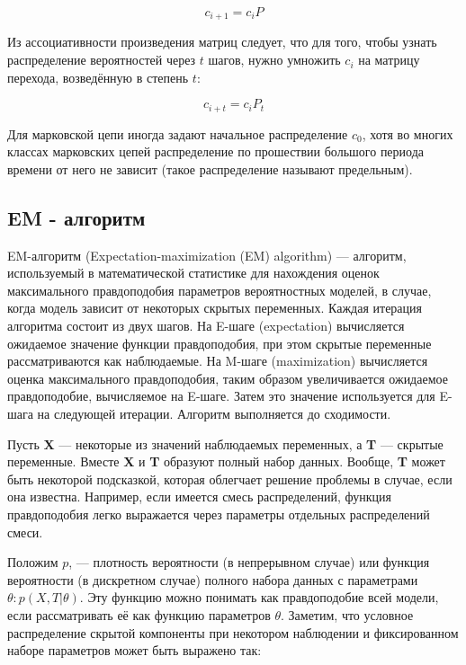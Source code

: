 \begin{equation}
  c_{i+1}=c_i P
\end{equation}

Из ассоциативности произведения матриц следует, что для того, чтобы узнать распределение вероятностей через $t$ шагов, нужно умножить $c_i$ на матрицу перехода, возведённую в степень $t$: 

\begin{equation}
  c_{i+t}=c_i P_t
\end{equation}

Для марковской цепи иногда задают начальное распределение $c_0$, хотя во многих классах марковских цепей распределение по прошествии большого периода времени от него не зависит (такое распределение называют предельным). 

\subsection{EM - алгоритм}

EM-алгоритм (Expectation-maximization (EM) algorithm) — алгоритм, используемый в математической статистике для нахождения оценок максимального правдоподобия параметров вероятностных моделей, в случае, когда модель зависит от некоторых скрытых переменных. Каждая итерация алгоритма состоит из двух шагов. На E-шаге (expectation) вычисляется ожидаемое значение функции правдоподобия, при этом скрытые переменные рассматриваются как наблюдаемые. На M-шаге (maximization) вычисляется оценка максимального правдоподобия, таким образом увеличивается ожидаемое правдоподобие, вычисляемое на E-шаге. Затем это значение используется для E-шага на следующей итерации. Алгоритм выполняется до сходимости.

Пусть \textbf{X} — некоторые из значений наблюдаемых переменных, а \textbf{T} — скрытые переменные. Вместе \textbf{X} и \textbf{T} образуют полный набор данных. Вообще, \textbf{T} может быть некоторой подсказкой, которая облегчает решение проблемы в случае, если она известна. Например, если имеется смесь распределений, функция правдоподобия легко выражается через параметры отдельных распределений смеси.

Положим $p$, — плотность вероятности (в непрерывном случае) или функция вероятности (в дискретном случае) полного набора данных с параметрами $\theta: p(X,T|\theta)$. Эту функцию можно понимать как правдоподобие всей модели, если рассматривать её как функцию параметров $\theta$. Заметим, что условное распределение скрытой компоненты при некотором наблюдении и фиксированном наборе параметров может быть выражено так:

